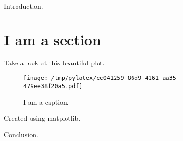 \documentclass{article}%
\begin{document}
%
Introduction.%
\section*{I am a section}%
Take a look at this beautiful plot:%


\begin{figure}[htbp]%
\centering%
\texttt{[image: /tmp/pylatex/ec041259-86d9-4161-aa35-479ee38f20a5.pdf]}%
\caption{I am a caption.}%
\end{figure}

%
Created using matplotlib.

%
Conclusion.%
\end{document}
